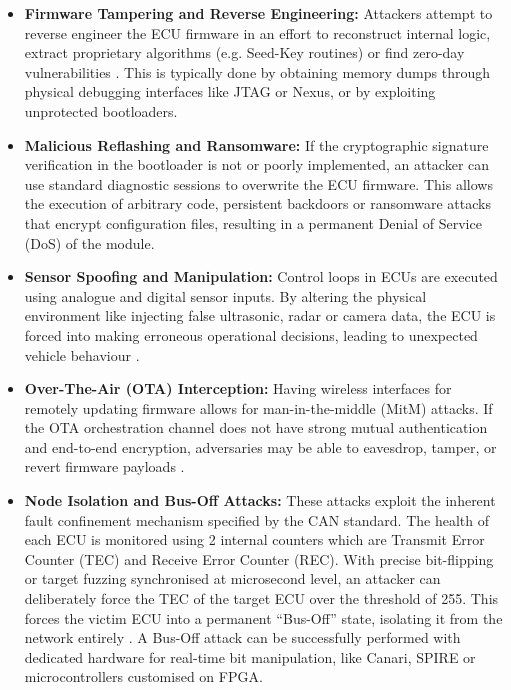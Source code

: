 \begin{itemize}
    \item \textbf{Firmware Tampering and Reverse Engineering:} Attackers attempt to reverse engineer the ECU firmware in an effort to reconstruct internal logic, extract proprietary algorithms (e.g. Seed-Key routines) or find zero-day vulnerabilities \cite{vandenherrewegen2018beneath}.
    This is typically done by obtaining memory dumps through physical debugging interfaces like JTAG or Nexus, or by exploiting unprotected bootloaders.
    \item \textbf{Malicious Reflashing and Ransomware:} If the cryptographic signature verification in the bootloader is not or poorly implemented, an attacker can use standard diagnostic sessions to overwrite the \gls{ECU} firmware. This allows the execution of arbitrary code, persistent backdoors or ransomware attacks that encrypt configuration files, resulting in a permanent Denial of Service (DoS) of the module\cite{Firmwareattack}.

    \item \textbf{Sensor Spoofing and Manipulation:} Control loops in \glspl{ECU} are executed using analogue and digital sensor inputs. By altering the physical environment like injecting false ultrasonic, radar or camera data, the \gls{ECU} is forced into making erroneous operational decisions, leading to unexpected vehicle behaviour \cite{petit2015remote,radar_spoofing2026}.
    
    \item \textbf{Over-The-Air (OTA) Interception:} Having wireless interfaces for remotely updating firmware allows for man-in-the-middle (MitM) attacks. If the \gls{OTA} orchestration channel does not have strong mutual authentication and end-to-end encryption, adversaries may be able to eavesdrop, tamper, or revert firmware payloads \cite{OTArollback}.
    
    \item \textbf{Node Isolation and Bus-Off Attacks:} These attacks exploit the inherent fault confinement mechanism specified by the \gls{CAN} standard. The health of each \gls{ECU} is monitored using 2 internal counters which are Transmit Error Counter (\gls{TEC}) and Receive Error Counter (\gls{REC}). With precise bit-flipping or target fuzzing synchronised at microsecond level, an attacker can deliberately force the \gls{TEC} of the target \gls{ECU} over the threshold of 255. This forces the victim \gls{ECU} into a permanent “Bus-Off” state, isolating it from the network entirely \cite{BusOff}.
A Bus-Off attack can be successfully performed with dedicated hardware for real-time bit manipulation, like Canari, SPIRE or microcontrollers customised on \gls{FPGA}.

\end{itemize}

